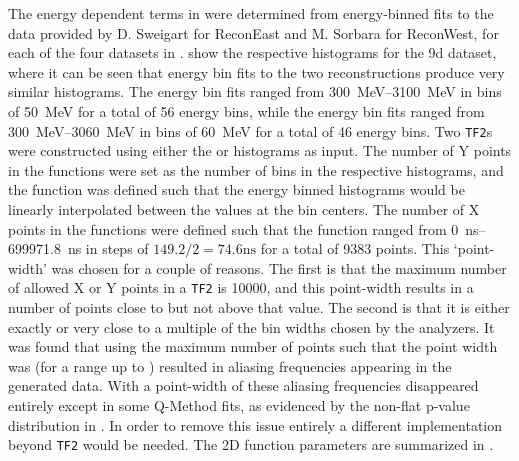 The energy dependent terms in  were determined from energy-binned fits to the data provided by D. Sweigart for ReconEast and M. Sorbara for ReconWest, for each of the four datasets in \Rone.  show the respective histograms for the 9d dataset, where it can be seen that energy bin fits to the two reconstructions produce very similar histograms. The \RE energy bin fits ranged from \SIrange{300}{3100}{\MeV} in bins of \SI{50}{\MeV} for a total of 56 energy bins, while the \RW energy bin fits ranged from \SIrange{300}{3060}{\MeV} in bins of \SI{60}{\MeV} for a total of 46 energy bins. Two \texttt{TF2}s were constructed using either the \RE or \RW histograms as input. The number of Y points in the functions were set as the number of bins in the respective histograms, and the function was defined such that the energy binned histograms would be linearly interpolated between the values at the bin centers. The number of X points in the functions were defined such that the function ranged from \SIrange{0}{699971.8}{ns} in steps of $149.2/2 = 74.6 \text{ns}$ for a total of 9383 points. This `point-width' was chosen for a couple of reasons. The first is that the maximum number of allowed X or Y points in a \texttt{TF2} is 10000, and this point-width results in a number of points close to but not above that value. The second is that it is either exactly or very close to a multiple of the bin widths chosen by the analyzers. It was found that using the maximum number of points such that the point width was  (for a range up to ) resulted in aliasing frequencies appearing in the generated data. With a point-width of  these aliasing frequencies disappeared entirely except in some Q-Method fits, as evidenced by the non-flat p-value distribution in \figref{}. In order to remove this issue entirely a different implementation beyond \texttt{TF2} would be needed. The 2D function parameters are summarized in .



